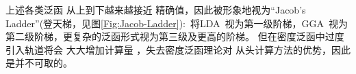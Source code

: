 {上述{各类}泛函%
从上到下越来越接近%
精确值，因此被形象地视为``Jacob's Ladder''(登天梯，见图\ref{Fig:Jacob-Ladder}):~将\textrm{LDA~}视为第一级阶梯，\textrm{GGA~}视为第二级阶梯，更复杂的泛函形式视为第三级及更高的阶梯。%
但在密度泛函中过度引入轨道将会%
{大大增加}计算量%
，失去密度泛函理论对%
从头计算方法的优势，因此是{并}不可取的。
%
%
}
